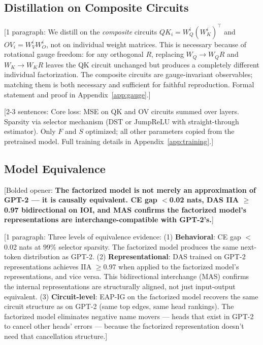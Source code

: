 \documentclass[11pt]{article}
\begin{document}
\subsection{Distillation on Composite Circuits}

[1 paragraph: We distill on the \emph{composite} circuits
$QK_i = W_Q^i (W_K^i)^\top$ and $OV_i = W_V^i W_O^i$, not on
individual weight matrices. This is necessary because of rotational
gauge freedom: for any orthogonal $R$, replacing $W_Q \to W_Q R$
and $W_K \to W_K R$ leaves the QK circuit unchanged but produces a
completely different individual factorization. The composite circuits
are gauge-invariant observables; matching them is both necessary and
sufficient for faithful reproduction. Formal statement and proof in
Appendix~\ref{app:gauge}.]


[2-3 sentences: Core loss: MSE on QK and OV circuits summed over layers.
Sparsity via selector mechanism (DST or JumpReLU with straight-through
estimator). Only $F$ and $S$ optimized; all other parameters copied
from the pretrained model. Full training details in
Appendix~\ref{app:training}.]

\subsection{Model Equivalence}
\label{sec:equivalence}


[Bolded opener: \textbf{The factorized model is not merely an approximation
of GPT-2 --- it is causally equivalent. CE gap $<$0.02 nats, DAS IIA
$\geq$0.97 bidirectional on IOI, and MAS confirms the factorized
model's representations are interchange-compatible with GPT-2's.}]

[1 paragraph: Three levels of equivalence evidence:
(1) \textbf{Behavioral}: CE gap $<$0.02 nats at 99\% selector sparsity.
    The factorized model produces the same next-token distribution as GPT-2.
(2) \textbf{Representational}: DAS trained on GPT-2 representations achieves
    IIA $\geq$0.97 when applied to the factorized model's representations,
    and vice versa. This bidirectional interchange (MAS) confirms the
    internal representations are structurally aligned, not just
    input-output equivalent.
(3) \textbf{Circuit-level}: EAP-IG on the factorized model recovers the
    same circuit structure as on GPT-2 (same top edges, same head rankings).
    The factorized model eliminates negative name movers --- heads that exist
    in GPT-2 to cancel other heads' errors --- because the factorized
    representation doesn't need that cancellation structure.]
\end{document}
